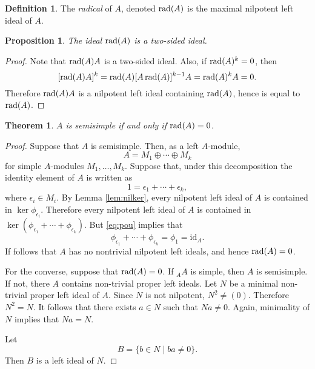 \documentclass[
]{book}
\newtheorem{theorem}{Theorem}[chapter]
\newtheorem{proposition}{Proposition}[chapter]
\theoremstyle{definition}
\newtheorem{definition}{Definition}[chapter]
\theoremstyle{definition}
\theoremstyle{definition}
\theoremstyle{definition}
\theoremstyle{remark}
\begin{document}
\begin{definition}
The \emph{radical} of \(A\), denoted \(\operatorname*{rad}(A)\) is the maximal nilpotent left ideal of \(A\).
\end{definition}

\begin{proposition}
The ideal \(\operatorname*{rad}(A)\) is a two-sided ideal.
\end{proposition}

\begin{proof}
Note that \(\operatorname*{rad}(A)A\) is a two-sided ideal.
Also, if \(\operatorname*{rad}(A)^k=0\), then
\[
[\operatorname*{rad}(A)A]^k = \operatorname*{rad}(A)[A\operatorname*{rad}(A)]^{k-1}A = \operatorname*{rad}(A)^kA = 0.
\]
Therefore \(\operatorname*{rad}(A)A\) is a nilpotent left ideal containing \(\operatorname*{rad}(A)\), hence is equal to \(\operatorname*{rad}(A)\).
\end{proof}

\begin{theorem}
\(A\) is semisimple if and only if \(\operatorname*{rad}(A)=0\).
\end{theorem}

\begin{proof}
Suppose that \(A\) is semisimple.
Then, as a left \(A\)-module,
\[
A = M_1\oplus \dotsb \oplus M_k
\]
for simple \(A\)-modules \(M_1,\dotsc,M_k\).
Suppose that, under this decomposition the identity element of \(A\) is written as
\begin{equation}
\label{eq:pou}
1 = \epsilon_1 + \dotsb + \epsilon_k,
\end{equation}
where \(\epsilon_i\in M_i\).
By Lemma \ref{lem:nilker}, every nilpotent left ideal of \(A\) is contained in \(\ker \phi_{\epsilon_i}\).
Therefore every nilpotent left ideal of \(A\) is contained in \(\ker(\phi_{\epsilon_1}+\dotsb + \phi_{\epsilon_k})\).
But \eqref{eq:pou} implies that
\[
\phi_{\epsilon_1}+\dotsb + \phi_{\epsilon_k} = \phi_1 = \mathrm{id}_A.
\]
If follows that \(A\) has no nontrivial nilpotent left ideals, and hence \(\operatorname*{rad}(A)=0\).

For the converse, suppose that \(\operatorname*{rad}(A)=0\).
If \({}_AA\) is simple, then \(A\) is semisimple.
If not, there \(A\) contains non-trivial proper left ideals.
Let \(N\) be a minimal non-trivial proper left ideal of \(A\).
Since \(N\) is not nilpotent, \(N^2\neq (0)\).
Therefore \(N^2=N\).
It follows that there exists \(a\in N\) such that \(Na\neq 0\).
Again, minimality of \(N\) implies that \(Na=N\).

Let
\[
B = \{b\in N\mid ba\neq 0\}.
\]
Then \(B\) is a left ideal of \(N\).
\end{proof}
\end{document}
